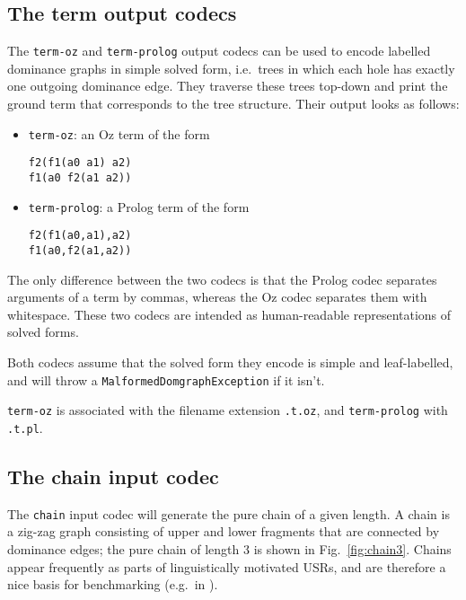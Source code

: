 \subsection{The term output codecs}

The \verb?term-oz? and \verb?term-prolog? output codecs can be used to
encode labelled dominance graphs in simple solved form, i.e.\ trees in
which each hole has exactly one outgoing dominance edge. They traverse
these trees top-down and print the ground term that corresponds to the
tree structure. Their output looks as follows:
\begin{itemize}
\item \verb?term-oz?: an Oz term of the form
\begin{verbatim}
f2(f1(a0 a1) a2)
f1(a0 f2(a1 a2))
\end{verbatim}
\item \verb?term-prolog?:  a Prolog term of the form
\begin{verbatim}
f2(f1(a0,a1),a2)
f1(a0,f2(a1,a2))
\end{verbatim}
\end{itemize}

The only difference between the two codecs is that the Prolog codec
separates arguments of a term by commas, whereas the Oz codec
separates them with whitespace. These two codecs are intended as
human-readable representations of solved forms.

Both codecs assume that the solved form they encode is simple and
leaf-labelled, and will throw a \verb?MalformedDomgraphException? if
it isn't.

\verb?term-oz? is associated with the filename extension \verb?.t.oz?, and
\verb?term-prolog? with \verb?.t.pl?.





\subsection{The chain input codec}

The \verb?chain? input codec will generate the pure chain
\cite{Koller04} of a given length. A chain is a zig-zag graph
consisting of upper and lower fragments that are connected by
dominance edges; the pure chain of length 3 is shown in
Fig.~\ref{fig:chain3}. Chains appear frequently as parts of
linguistically motivated USRs, and are therefore a nice basis for
benchmarking (e.g.\ in \cite{bodirsky-weakly-normal-constraints}).

